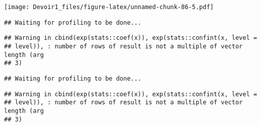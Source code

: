 \documentclass[]{article}
\newenvironment{Shaded}{\begin{snugshade}}{\end{snugshade}}
\newcommand{\KeywordTok}[1]{\textcolor[rgb]{0.13,0.29,0.53}{\textbf{#1}}}
\newcommand{\DataTypeTok}[1]{\textcolor[rgb]{0.13,0.29,0.53}{#1}}
\newcommand{\DecValTok}[1]{\textcolor[rgb]{0.00,0.00,0.81}{#1}}
\newcommand{\StringTok}[1]{\textcolor[rgb]{0.31,0.60,0.02}{#1}}
\newcommand{\OperatorTok}[1]{\textcolor[rgb]{0.81,0.36,0.00}{\textbf{#1}}}
\newcommand{\NormalTok}[1]{#1}
\begin{document}
\texttt{[image: Devoir1\_files/figure-latex/unnamed-chunk-86-5.pdf]}

\begin{Shaded}
\end{Shaded}

\begin{verbatim}
## Waiting for profiling to be done...
\end{verbatim}

\begin{verbatim}
## Warning in cbind(exp(stats::coef(x)), exp(stats::confint(x, level =
## level)), : number of rows of result is not a multiple of vector length (arg
## 3)
\end{verbatim}

\begin{verbatim}
## Waiting for profiling to be done...
\end{verbatim}

\begin{verbatim}
## Warning in cbind(exp(stats::coef(x)), exp(stats::confint(x, level =
## level)), : number of rows of result is not a multiple of vector length (arg
## 3)
\end{verbatim}
\end{document}
